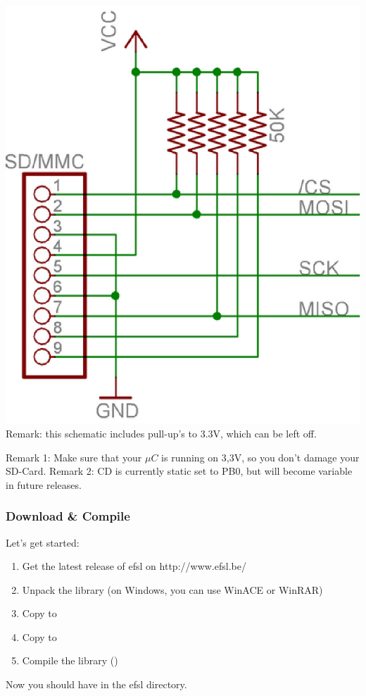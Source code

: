 \parbox[c]{.5\textwidth}{\begin{center}
	\includegraphics[width=.5\textwidth]{pics/sdconnection}
	\newline\newline
	Remark: this schematic includes pull-up's to 3.3V, which
	can be left off.
\end{center}}
\newline
Remark 1: Make sure that your $\mu C$ is running on 3,3V, so you don't
damage your SD-Card.\newline
\newline
Remark 2: CD is currently static set to PB0, but will become variable
in future releases.
\subsubsection{Download \& Compile}
Let's get started:
\begin{enumerate}
	\item{Get the latest release of efsl on http://www.efsl.be/}
	\item{Unpack the library (on Windows, you can use WinACE or WinRAR)}
	\item{Copy  to }
	\item{Copy  to }
	\item{Compile the library ()}
\end{enumerate}
Now you should have  in the efsl directory.
